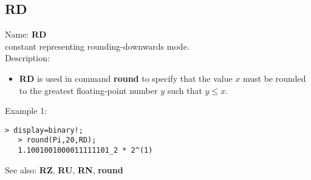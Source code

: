\subsection{ RD }
\noindent Name: \textbf{RD}\\
constant representing rounding-downwards mode.\\

\noindent Description: \begin{itemize}

\item \textbf{RD} is used in command \textbf{round} to specify that the value $x$ must be rounded
   to the greatest floating-point number $y$ such that $y \le x$.
\end{itemize}
\noindent Example 1: 
\begin{center}\begin{minipage}{14.8cm}\begin{Verbatim}[frame=single]
   > display=binary!;
   > round(Pi,20,RD);
   1.1001001000011111101_2 * 2^(1)
\end{Verbatim}
\end{minipage}\end{center}
See also: \textbf{RZ}, \textbf{RU}, \textbf{RN}, \textbf{round}
